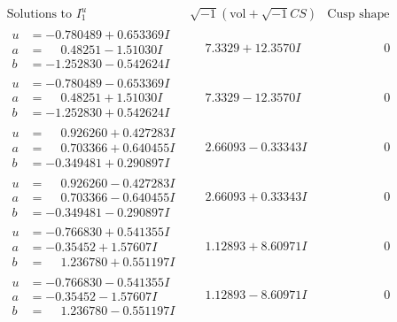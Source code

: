 \documentclass[1p]{elsarticle_modified}
\theoremstyle{definition}
\newcommand{\I}{\sqrt{-1}}
\begin{document}
$$\begin{array}{c|c|c}  
\text{Solutions to }I^u_{1}& \I (\text{vol} + \sqrt{-1}CS) & \text{Cusp shape}\\
 \hline 
\begin{aligned}
u &= -0.780489 + 0.653369 I \\
a &= \phantom{-}0.48251 - 1.51030 I \\
b &= -1.252830 - 0.542624 I\end{aligned}
 & \phantom{-}7.3329 + 12.3570 I & \phantom{-0.000000 } 0 \\ \hline\begin{aligned}
u &= -0.780489 - 0.653369 I \\
a &= \phantom{-}0.48251 + 1.51030 I \\
b &= -1.252830 + 0.542624 I\end{aligned}
 & \phantom{-}7.3329 - 12.3570 I & \phantom{-0.000000 } 0 \\ \hline\begin{aligned}
u &= \phantom{-}0.926260 + 0.427283 I \\
a &= \phantom{-}0.703366 + 0.640455 I \\
b &= -0.349481 + 0.290897 I\end{aligned}
 & \phantom{-}2.66093 - 0.33343 I & \phantom{-0.000000 } 0 \\ \hline\begin{aligned}
u &= \phantom{-}0.926260 - 0.427283 I \\
a &= \phantom{-}0.703366 - 0.640455 I \\
b &= -0.349481 - 0.290897 I\end{aligned}
 & \phantom{-}2.66093 + 0.33343 I & \phantom{-0.000000 } 0 \\ \hline\begin{aligned}
u &= -0.766830 + 0.541355 I \\
a &= -0.35452 + 1.57607 I \\
b &= \phantom{-}1.236780 + 0.551197 I\end{aligned}
 & \phantom{-}1.12893 + 8.60971 I & \phantom{-0.000000 } 0 \\ \hline\begin{aligned}
u &= -0.766830 - 0.541355 I \\
a &= -0.35452 - 1.57607 I \\
b &= \phantom{-}1.236780 - 0.551197 I\end{aligned}
 & \phantom{-}1.12893 - 8.60971 I & \phantom{-0.000000 } 0 \\ \hline\begin{aligned}

\end{aligned}
\end{array}$$
\end{document}

